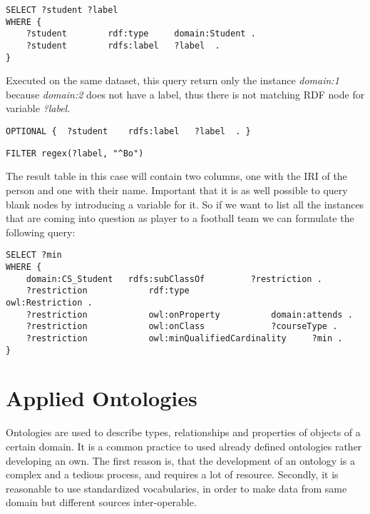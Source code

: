 \begin{lstlisting}[captionpos=b, caption=SPARQL Query II., label=2nd:sparql, belowskip=1em, aboveskip=2em,
basicstyle=\footnotesize,frame=single]
SELECT ?student ?label 
WHERE { 
	?student		rdf:type	 domain:Student .	
	?student		rdfs:label	 ?label  .
}
\end{lstlisting}

Executed on the same dataset, this query return only the instance \textit{domain:1} because \textit{domain:2} does not have a label, thus there is not matching RDF node for variable \textit{?label}. 


\begin{lstlisting}[captionpos=b, caption=SPARQL Query II., label=2nd:sparql, belowskip=1em, aboveskip=2em,
basicstyle=\footnotesize,frame=single]
OPTIONAL { 	?student	rdfs:label	 ?label  . } 
\end{lstlisting}


\begin{lstlisting}[captionpos=b, caption=SPARQL Query II., label=2nd:sparql, belowskip=1em, aboveskip=2em,
basicstyle=\footnotesize,frame=single]
FILTER regex(?label, "^Bo")
\end{lstlisting}


The result table in this case will contain two columns, one with the IRI of the person and one with their name. Important that it is as well possible to query blank nodes by introducing a variable for it. So if we want to list all the instances that are coming into question as player to a football team we can formulate the following query:

\begin{lstlisting}[captionpos=b, caption=SPARQL Query III., label=3rd:sparql, belowskip=1em, aboveskip=2em,
basicstyle=\footnotesize,frame=single]
SELECT ?min
WHERE {
	domain:CS_Student	rdfs:subClassOf			?restriction .
	?restriction			rdf:type						owl:Restriction .
	?restriction			owl:onProperty			domain:attends .
	?restriction			owl:onClass				?courseType .
	?restriction			owl:minQualifiedCardinality		?min .
}
\end{lstlisting}


\newpage
\section{Applied Ontologies} \label{22}

Ontologies are used to describe types, relationships and properties of objects of a certain domain. It is a common practice to used already defined 
ontologies rather developing an own. The first reason is, that the development of an ontology is a complex and a tedious process, and requires a lot of resource. Secondly, it is reasonable to use standardized vocabularies, in order to make data from same domain but different sources inter-operable.

